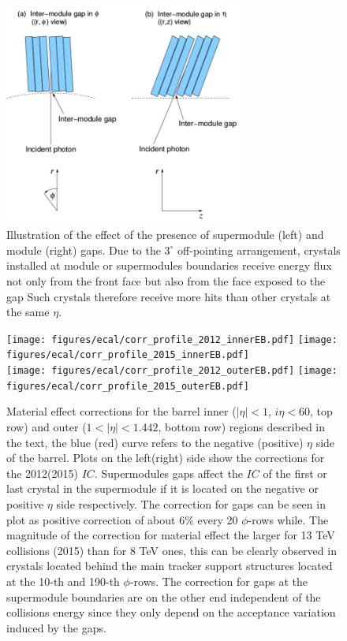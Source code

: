 \begin{figure}[h!]
  \centering
  \includegraphics[width = 0.7\textwidth]{figures/ecal/images/Ecal_detector/SM_gap_phi_sym.png}
  \caption{Illustration of the effect of the presence of supermodule (left) and module (right) gaps.
    Due to the $3^{\circ}$ off-pointing arrangement, crystals installed at module or supermodules boundaries
    receive energy flux not only from the front face but also from the face exposed to the gap
    Such crystals therefore receive more hits than other crystals at the same $\eta$.}
  \label{fig:ecal_gaps}
\end{figure}

\begin{figure}[h!]
  \centering
  \texttt{[image: figures/ecal/corr\_profile\_2012\_innerEB.pdf]}
  \texttt{[image: figures/ecal/corr\_profile\_2015\_innerEB.pdf]}\\
  \texttt{[image: figures/ecal/corr\_profile\_2012\_outerEB.pdf]}
  \texttt{[image: figures/ecal/corr\_profile\_2015\_outerEB.pdf]}
  \caption{Material effect corrections for the barrel inner ($|\eta| < 1$, $i\eta < 60$, top row)
    and outer ($1 < |\eta| < 1.442$, bottom row)
    regions described in the text, the blue (red) curve refers to the negative (positive) $\eta$ side of the barrel.
    Plots on the left(right) side show the corrections for the 2012(2015) $IC$.
    Supermodules gaps affect the $IC$ of the first or last crystal in the supermodule if it is located on the negative or
    positive $\eta$ side respectively. The correction for gaps can be seen in plot as positive correction of about $6\%$
    every 20 $\phi$-rows while. The magnitude of the correction for material effect the larger for 13 TeV collisions (2015)
    than for 8 TeV ones, this can be clearly observed in crystals located behind the main tracker support structures located
    at the 10-th and 190-th $\phi$-rows. The correction for gaps at the supermodule boundaries are on the other end
  independent of the collisions energy since they only depend on the acceptance variation induced by the gaps.}
  \label{fig:material_corrections}
\end{figure}

